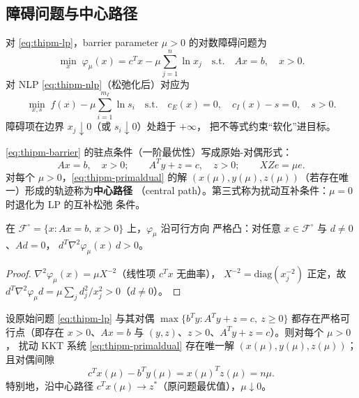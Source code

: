 \subsection{障碍问题与中心路径}\label{subsec:thipm-central-path}

\begin{definition}[对数障碍问题]\label{def:thipm-barrier}
对 \eqref{eq:thipm-lp}，barrier parameter $\mu>0$ 的对数障碍问题为
\begin{equation}\label{eq:thipm-barrier}
  \min_{x}\; \varphi_\mu(x)=c^{T}x-\mu\sum_{j=1}^{n}\ln x_j
  \quad\text{s.t.}\quad Ax=b,\quad x>0 .
\end{equation}
对 NLP \eqref{eq:thipm-nlp}（松弛化后）对应为
\begin{equation}\label{eq:thipm-barrier-nlp}
  \min_{x,s}\; f(x)-\mu\sum_{i=1}^{m_I}\ln s_i
  \quad\text{s.t.}\quad c_E(x)=0,\quad c_I(x)-s=0,\quad s>0 .
\end{equation}
障碍项在边界 $x_j\downarrow0$（或 $s_i\downarrow0$）处趋于 $+\infty$，
把不等式约束``软化''进目标。
\end{definition}

\begin{definition}\label{def:thipm-perturbed-kkt}
\eqref{eq:thipm-barrier} 的驻点条件（一阶最优性）写成原始-对偶形式：
\begin{equation}\label{eq:thipm-primaldual}
  Ax=b,\quad x>0;\qquad
  A^{T}y+z=c,\quad z>0;\qquad
  XZe=\mu e .
\end{equation}
对每个 $\mu>0$，\eqref{eq:thipm-primaldual} 的解
$(x(\mu),y(\mu),z(\mu))$（若存在唯一）形成的轨迹称为\textbf{中心路径}
（central path）。第三式称为扰动互补条件：$\mu=0$ 时退化为 LP 的互补松弛
条件。
\end{definition}

\begin{lemma}[障碍问题的严格凸性]\label{lem:thipm-strictconvex}
在 $\mathcal{F}^{\circ}=\{x:Ax=b,\ x>0\}$ 上，$\varphi_\mu$ 沿可行方向
严格凸：对任意 $x\in\mathcal{F}^{\circ}$ 与 $d\ne0$、$Ad=0$，
$d^{T}\nabla^{2}\varphi_\mu(x)\,d>0$。
\end{lemma}

\begin{proof}
$\nabla^{2}\varphi_\mu(x)=\mu X^{-2}$（线性项 $c^{T}x$ 无曲率），
$X^{-2}=\mathrm{diag}(x_j^{-2})$ 正定，故
$d^{T}\nabla^{2}\varphi_\mu d=\mu\sum_j d_j^{2}/x_j^{2}>0$（$d\ne0$）。
\end{proof}

\begin{theorem}[LP 中心路径的存在唯一性]\label{thm:thipm-centralpath}
设原始问题 \eqref{eq:thipm-lp} 与其对偶
$\max\{b^{T}y:A^{T}y+z=c,\ z\ge0\}$ 都存在严格可行点（即存在
$x>0$、$Ax=b$ 与 $(y,z)$、$z>0$、$A^{T}y+z=c$）。则对每个 $\mu>0$，
扰动 KKT 系统 \eqref{eq:thipm-primaldual} 存在唯一解
$(x(\mu),y(\mu),z(\mu))$；且对偶间隙
\begin{equation}\label{eq:thipm-gap}
  c^{T}x(\mu)-b^{T}y(\mu)=x(\mu)^{T}z(\mu)=n\mu .
\end{equation}
特别地，沿中心路径 $c^{T}x(\mu)\to z^{*}$（原问题最优值），$\mu\downarrow0$。
\end{theorem}

